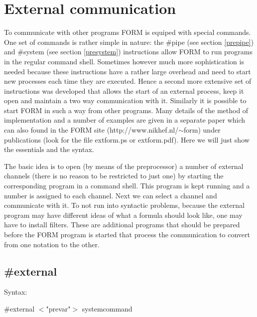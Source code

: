 \chapter{External communication}
\label{externalcommunication}

To communicate with other programs FORM is 
equiped with special commands. One set of commands is rather simple in 
nature: the \#pipe (see section \ref{prepipe}) and 
\#system (see section \ref{presystem}) instructions allow 
FORM to run programs in the regular command 
shell. Sometimes however much more sophistication is needed 
because these instructions have a rather large overhead and need to start 
new processes each time they are executed. Hence a second more extensive 
set of instructions was developed that allows the start of an external 
process, keep it open and maintain a two way 
communication with it. Similarly it is 
possible to start FORM in such a way from other programs. Many details of 
the method of implementation and a number of examples are given in a 
separate paper which can also found in the FORM site 
(http://www.nikhef.nl/$\sim$form) under publications (look for the file 
extform.ps or extform.pdf). Here we 
will just show the essentials and the syntax.

The basic idea is to open (by means of the preprocessor) a number of 
external channels (there is no reason to be 
restricted to just one) by starting the corresponding program in a command 
shell. This program is kept running and a number is assigned to each 
channel. Next we can select a channel and communicate with it. To not run 
into syntactic problems, because the external program may have different 
ideas of what a formula should look like, one may have to install 
filters. These are additional programs that should be 
prepared before the FORM program is started that process the communication 
to convert from one notation to the other.


\section{\#external}
\label{external}

\noindent Syntax:

\#external $<$"prevar"$>$ systemcommand

